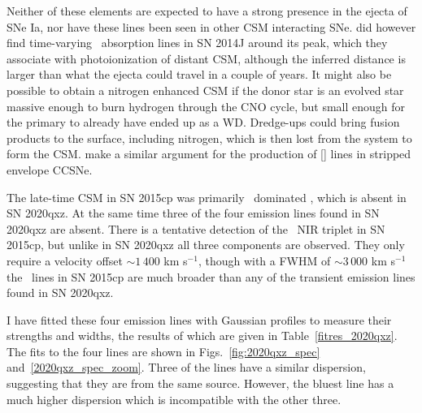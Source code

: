 \documentclass[a4paper,oneside,12pt, class=Latex/Classes/PhDthesisPSnPDF, crop=false]{standalone}
\begin{document}
Neither of these elements are expected to have a strong presence in the ejecta of SNe Ia, nor have these lines been seen in other CSM interacting SNe. \citet{2014J_KI} did however find time-varying \KI\ absorption lines in SN 2014J around its peak, which they associate with photoionization of distant CSM, although the inferred distance is larger than what the ejecta could travel in a couple of years. It might also be possible to obtain a nitrogen enhanced CSM if the donor star is an evolved star massive enough to burn hydrogen through the CNO cycle, but small enough for the primary to already have ended up as a WD. Dredge-ups could bring fusion products to the surface, including nitrogen, which is then lost from the system to form the CSM. \citet{N_lines_SECCSN} make a similar argument for the production of [\NII] lines in stripped envelope CCSNe.

The late-time CSM in SN 2015cp was primarily \Halpha\ dominated \citep{2015cp}, which is absent in SN 2020qxz. At the same time three of the four emission lines found in SN 2020qxz are absent. There is a tentative detection of the \CaII\ NIR triplet in SN 2015cp, but unlike in SN 2020qxz all three components are observed. They only require a velocity offset $\sim1\,400$ km s$^{-1}$, though with a FWHM of $\sim3\,000$ km s$^{-1}$ the \CaII\ lines in SN 2015cp are much broader than any of the transient emission lines found in SN 2020qxz.

I have fitted these four emission lines with Gaussian profiles to measure their strengths and widths, the results of which are given in Table~\ref{fitres_2020qxz}. The fits to the four lines are shown in Figs.~\ref{fig:2020qxz_spec} and~\ref{2020qxz_spec_zoom}. Three of the lines have a similar dispersion, suggesting that they are from the same source. However, the bluest line has a much higher dispersion which is incompatible with the other three. 
\end{document}
